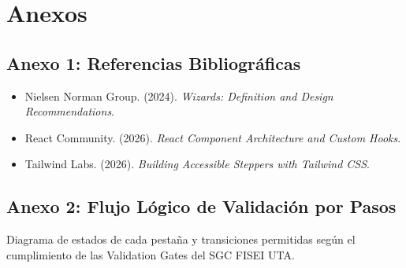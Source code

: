\documentclass[12pt,a4paper]{article}
\begin{document}
\vspace{0.4cm}

\section{Anexos}

\subsection*{Anexo 1: Referencias Bibliográficas}
\begin{itemize}[leftmargin=1.5em, itemsep=2pt]
    \item Nielsen Norman Group. (2024). \textit{Wizards: Definition and Design Recommendations}.
    \item React Community. (2026). \textit{React Component Architecture and Custom Hooks}.
    \item Tailwind Labs. (2026). \textit{Building Accessible Steppers with Tailwind CSS}.
\end{itemize}

\subsection*{Anexo 2: Flujo Lógico de Validación por Pasos}
Diagrama de estados de cada pestaña y transiciones permitidas según el cumplimiento de las Validation Gates del SGC FISEI UTA.
\end{document}
